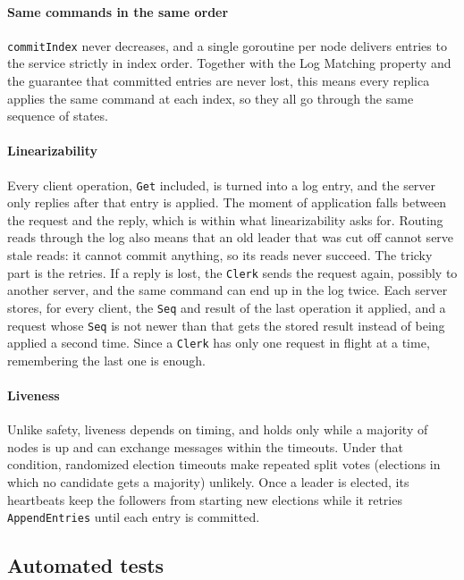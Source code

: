 \documentclass[conference]{IEEEtran}
\begin{document}
\paragraph{Same commands in the same order} \texttt{commitIndex} never decreases, and a single goroutine per node delivers entries to the service strictly in index order.
Together with the Log Matching property and the guarantee that committed entries are never lost, this means every replica applies the same command at each index,
so they all go through the same sequence of states.

\paragraph{Linearizability} Every client operation, \texttt{Get} included, is turned into a log entry, and the server only replies after that entry is applied.
The moment of application falls between the request and the reply, which is within what linearizability asks for.
Routing reads through the log also means that an old leader that was cut off cannot serve stale reads: it cannot commit anything, so its reads never succeed. The tricky part is the retries.
If a reply is lost, the \texttt{Clerk} sends the request again, possibly to another server, and the same command can end up in the log twice. Each server stores, for every client,
the \texttt{Seq} and result of the last operation it applied, and a request whose \texttt{Seq} is not newer than that gets the stored result instead of being applied a second time.
Since a \texttt{Clerk} has only one request in flight at a time, remembering the last one is enough.

\paragraph{Liveness} Unlike safety, liveness depends on timing, and holds only while a majority of nodes is up and can exchange messages within the timeouts. Under that condition,
randomized election timeouts make repeated split votes (elections in which no candidate gets a majority) unlikely. Once a leader is elected,
its heartbeats keep the followers from starting new elections while it retries \texttt{AppendEntries} until each entry is committed.

\subsection{Automated tests}\label{sec:correct-tests}
\end{document}
